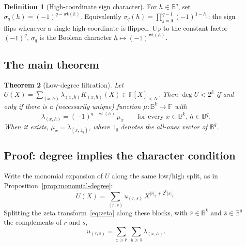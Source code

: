 \documentclass[preprint,3p,12pt,numbers]{elsarticle}
\newtheorem{theorem}{Theorem}[section]
\theoremstyle{definition}
\newtheorem{definition}[theorem]{Definition}
\theoremstyle{remark}
\newcommand{\wt}{\mathrm{wt}}
\begin{document}
\begin{definition}[High-coordinate sign character]
\label{def:character}
For $h \in \mathbb{B}^{q}$, set $\sigma_q(h) = (-1)^{q-\wt(h)}$.
Equivalently $\sigma_q(h) = \prod_{j=0}^{q-1}(-1)^{1-h_j}$: the sign flips
whenever a single high coordinate is flipped. Up to the constant factor
$(-1)^q$, $\sigma_q$ is the Boolean character $h \mapsto (-1)^{\wt(h)}$.
\end{definition}

\subsection{The main theorem}
\label{subsec:main-thm}

\begin{theorem}[Low-degree filtration]
\label{thm:filtration}
Let $U(X) = \sum_{(x,h)} \lambda_{(x,h)} K_{(x,h)}(X) \in \mathbb{F}[X]_{<N}$.
Then $\deg U < 2^k$ if and only if there is a (necessarily unique) function
$\mu : \mathbb{B}^k \to \mathbb{F}$ with
\[
  \lambda_{(x,h)} = (-1)^{q-\wt(h)}\, \mu_x
  \qquad \text{for every } x \in \mathbb{B}^k,\ h \in \mathbb{B}^{q} .
\]
When it exists, $\mu_x = \lambda_{(x,1_{q})}$, where $1_{q}$ denotes the
all-ones vector of $\mathbb{B}^{q}$.
\end{theorem}

\subsection{Proof: degree implies the character condition}
\label{subsec:proof-forward}

Write the monomial expansion of $U$ along the same low/high split,
as in Proposition~\ref{prop:monomial-degree}:
\[
  U(X) =
  \sum_{(r,s)} u_{(r,s)}\, X^{|r|_2+2^k|s|_2}.
\] Splitting the zeta
transform~\eqref{eq:zeta} along these blocks, with $\bar r \in \mathbb{B}^k$
and $\bar s \in \mathbb{B}^{q}$ the complements of $r$ and $s$,
\begin{equation}
\label{eq:block-zeta}
  u_{(r,s)} = \sum_{x \geq \bar r}\ \sum_{h \geq \bar s} \lambda_{(x,h)} .
\end{equation}
\end{document}
